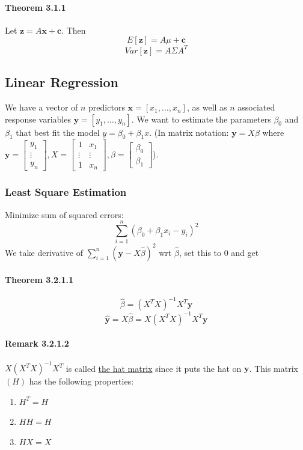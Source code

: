 \documentclass[11pt]{article}
\newcommand{\tb}[1]{\textbf{#1}}
\newcommand{\under}[1]{\underline{#1}}
\newcommand{\vx}[0]{\tb{x}}
\newcommand{\vy}[0]{\tb{y}}
\newcommand{\vz}[0]{\tb{z}}
\newcommand{\vc}[0]{\tb{c}}
\begin{document}
\paragraph{Theorem 3.1.1}
Let $\vz = A\vx + \vc$. Then $$E[\vz] = A\mu + \vc$$
$$Var[\vz] = A\Sigma A^T$$
\subsection{Linear Regression}
We have a vector of $n$ predictors $\vx = [x_1,\hdots,x_n]$, as well as $n$ associated response variables $\vy = [y_1, \hdots, y_n]$. We want to estimate the parameters $\beta_0$ and $\beta_1$ that best fit the model $y = \beta_0 + \beta_1 x$. (In matrix notation: $\vy = X\beta$ where $\vy = \begin{bmatrix}
	y_1 \\ \vdots \\ y_n \end{bmatrix}, X = \begin{bmatrix}
		1 & x_1 \\ \vdots & \vdots \\ 1 & x_n
	\end{bmatrix}, \beta = \begin{bmatrix} \beta_0 \\ \beta_1 \end{bmatrix}$).
\subsubsection{Least Square Estimation}
Minimize sum of squared errors: $$\sum_{i=1}^n (\beta_0 + \beta_1 x_i - y_i)^2$$
We take derivative of $\sum_{i=1}^n (\vy - X\hat{\beta})^2$ wrt $\hat{\beta}$, set this to 0 and get 
\paragraph{Theorem 3.2.1.1}$$\hat{\beta} = (X^TX)^{-1}X^T\vy$$
$$\hat{\vy} = X\hat{\beta} = X(X^TX)^{-1}X^T\vy$$
\paragraph{Remark 3.2.1.2}
$X(X^TX)^{-1}X^T$ is called \under{the hat matrix} since it puts the hat on $\vy$. This matrix $(H)$ has the following properties:
\begin{enumerate}
    \item $H^T = H$
    \item $HH = H$
    \item $HX = X$
\end{enumerate}
\end{document}
